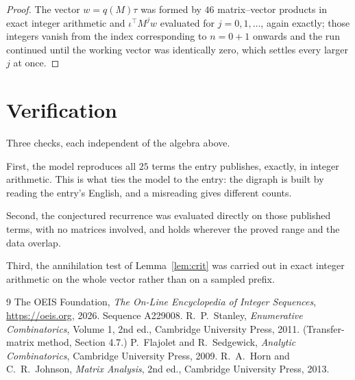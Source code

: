 \documentclass[11pt,a4paper]{article}
\theoremstyle{plain}
\theoremstyle{definition}
\begin{document}
\begin{proof}
The vector $w=q(M)\tau$ was formed by $46$ matrix--vector products in exact integer
arithmetic and $\iota^{\!\top}M^{j}w$ evaluated for $j=0,1,\dots$, again exactly; those
integers vanish from the index corresponding to $n=0+1$ onwards and the run continued
until the working vector was identically zero, which settles every larger $j$ at once.
\end{proof}

\section{Verification}

Three checks, each independent of the algebra above.

First, the model reproduces all $25$ terms the entry publishes, exactly, in integer
arithmetic. This is what ties the model to the entry: the digraph is built by reading the
entry's English, and a misreading gives different counts.

Second, the conjectured recurrence was evaluated directly on those published terms, with no
matrices involved, and holds wherever the proved range and the data overlap.

Third, the annihilation test of Lemma~\ref{lem:crit} was carried out in exact integer
arithmetic on the whole vector rather than on a sampled prefix.

\begin{thebibliography}{9}
 The OEIS Foundation, \emph{The On-Line Encyclopedia of Integer
Sequences}, \url{https://oeis.org}, 2026. Sequence A229008.
 R.~P.~Stanley, \emph{Enumerative Combinatorics}, Volume 1, 2nd ed.,
Cambridge University Press, 2011. (Transfer-matrix method, Section 4.7.)
 P.~Flajolet and R.~Sedgewick, \emph{Analytic Combinatorics}, Cambridge
University Press, 2009.
 R.~A.~Horn and C.~R.~Johnson, \emph{Matrix Analysis}, 2nd ed., Cambridge
University Press, 2013.
\end{thebibliography}
\end{document}
